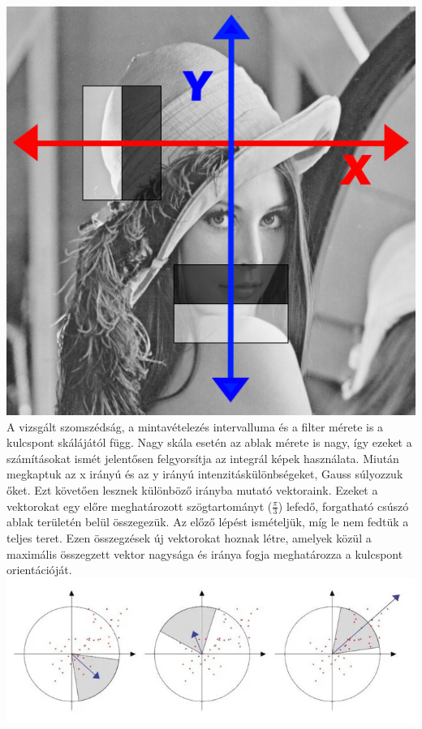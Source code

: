 \documentclass[12pt]{report}
\begin{document}
\begin{enumerate}
\begin{enumerate}
                        \includegraphics[scale=0.4]{lena_haar.png}\\
                        A vizsgált szomszédság, a mintavételezés intervalluma és a filter mérete is a kulcspont skálájától függ. Nagy skála esetén az ablak mérete is nagy, így ezeket a számításokat ismét jelentősen felgyorsítja az integrál képek használata. Miután megkaptuk az x irányú és az y irányú intenzitáskülönbségeket, Gauss súlyozzuk őket. Ezt követően lesznek különböző irányba mutató vektoraink. Ezeket a vektorokat egy előre meghatározott szögtartományt ($\frac{\pi}{3}$) lefedő, forgatható csúszó ablak területén belül összegezük. Az előző lépést ismételjük, míg le nem fedtük a teljes teret. Ezen összegzések új vektorokat hoznak létre, amelyek közül a maximális összegzett vektor nagysága és iránya fogja meghatározza a kulcspont orientációját.\\
                        \includegraphics[scale=0.5]{haar_vectors.png}\\

\end{enumerate}
\end{enumerate}
\end{document}
